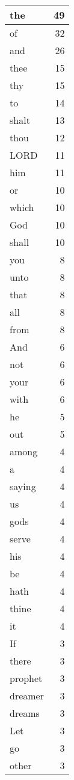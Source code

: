\begin{center}
\begin{longtable}{l|r}
\hline \hline
\endlastfoot
the & 49 \\ \hline
of & 32 \\ \hline
and & 26 \\ \hline
thee & 15 \\ \hline
thy & 15 \\ \hline
to & 14 \\ \hline
shalt & 13 \\ \hline
thou & 12 \\ \hline
LORD & 11 \\ \hline
him & 11 \\ \hline
or & 10 \\ \hline
which & 10 \\ \hline
God & 10 \\ \hline
shall & 10 \\ \hline
you & 8 \\ \hline
unto & 8 \\ \hline
that & 8 \\ \hline
all & 8 \\ \hline
from & 8 \\ \hline
And & 6 \\ \hline
not & 6 \\ \hline
your & 6 \\ \hline
with & 6 \\ \hline
he & 5 \\ \hline
out & 5 \\ \hline
among & 4 \\ \hline
a & 4 \\ \hline
saying & 4 \\ \hline
us & 4 \\ \hline
gods & 4 \\ \hline
serve & 4 \\ \hline
his & 4 \\ \hline
be & 4 \\ \hline
hath & 4 \\ \hline
thine & 4 \\ \hline
it & 4 \\ \hline
If & 3 \\ \hline
there & 3 \\ \hline
prophet & 3 \\ \hline
dreamer & 3 \\ \hline
dreams & 3 \\ \hline
Let & 3 \\ \hline
go & 3 \\ \hline
other & 3 \\ \hline

\end{longtable}
\end{center}
